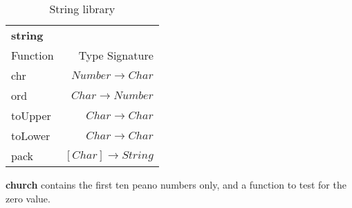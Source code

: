 \begin{table}[H]
    \begin{tabular}{l r}
    \rowcolor{light-gray}
        \textbf{string} & \\
        Function & Type Signature \\
        \hline
        chr & $Number \rightarrow Char$ \\
        ord & $Char \rightarrow Number$ \\
        toUpper & $Char \rightarrow Char$ \\
        toLower & $Char \rightarrow Char$ \\
        pack & $[Char] \rightarrow String$ \\
    \end{tabular}
    \caption{String library}
\label{table:string}
\end{table}
\textbf{church} contains the first ten peano numbers only, and a function to test for the zero
value.
